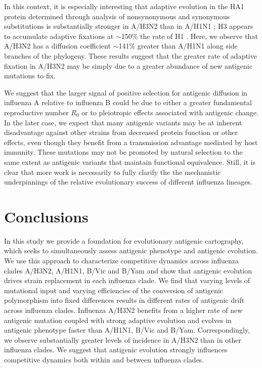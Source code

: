 \documentclass[11pt,oneside,letterpaper]{article}
\begin{document}
In this context, it is especially interesting that adaptive evolution in the HA1 protein determined through analysis of nonsynonymous and synonymous substitutions is substantially stronger in A/H3N2 than in A/H1N1 \cite{Wolf06}; H3 appears to accumulate adaptive fixations at $\sim$150\% the rate of H1 \cite{Bhatt11}.
Here, we observe that A/H3N2 has a diffusion coefficient $\sim$141\% greater than A/H1N1 along side branches of the phylogeny.
These results suggest that the greater rate of adaptive fixation in A/H3N2 may be simply due to a greater abundance of new antigenic mutations to fix.

We suggest that the larger signal of positive selection for antigenic diffusion in influenza A relative to influenza B could be due to either a greater fundamental reproductive number $R_0$ or to pleiotropic effects associated with antigenic change.
In the later case, we expect that many antigenic variants may be at inherent disadvantage against other strains from decreased protein function \cite{Kaverin04,Rudneva12} or other effects, even though they benefit from a transmission advantage mediated by host immunity.
These mutations may not be promoted by natural selection to the same extent as antigenic variants that maintain functional equivalence.
Still, it is clear that more work is necessarily to fully clarify the the mechanistic underpinnings of the relative evolutionary success of different influenza lineages.

\section*{Conclusions}

In this study we provide a foundation for evolutionary antigenic cartography, which seeks to simultaneously assess antigenic phenotype and antigenic evolution.
We use this approach to characterize competitive dynamics across influenza clades A/H3N2, A/H1N1, B/Vic and B/Yam and show that antigenic evolution drives strain replacement in each influenza clade.
We find that varying levels of mutational input and varying efficiencies of the conversion of antigenic polymorphism into fixed differences results in different rates of antigenic drift across influenza clades.
Influenza A/H3N2 benefits from a higher rate of new antigenic mutation coupled with strong adaptive evolution and evolves in antigenic phenotype faster than A/H1N1, B/Vic and B/Yam.
Correspondingly, we observe substantially greater levels of incidence in A/H3N2 than in other influenza clades.
We suggest that antigenic evolution strongly influences competitive dynamics both within and between influenza clades.
\end{document}
